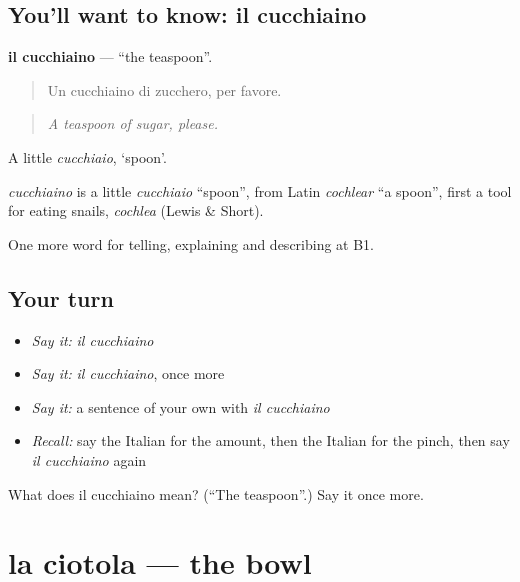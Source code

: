 \subsection*{You'll want to know: il cucchiaino}
\textbf{il cucchiaino} — \textquotedblleft{}the teaspoon\textquotedblright{}.

\begin{quote}
Un cucchiaino di zucchero, per favore.
\end{quote}

\begin{quote}
\emph{A teaspoon of sugar, please.}
\end{quote}

A little \emph{cucchiaio}, ‘spoon’.

\begin{cousinweb}
\emph{cucchiaino} is a little \emph{cucchiaio} \textquotedblleft{}spoon\textquotedblright{}, from Latin \emph{cochlear} \textquotedblleft{}a spoon\textquotedblright{}, first a tool for eating snails, \emph{cochlea} (Lewis \& Short).
\end{cousinweb}

\begin{grammarlens}[title={What you've built}]
One more word for telling, explaining and describing at B1.
\end{grammarlens}

\subsection*{Your turn}
\begin{itemize}
\raggedright
  \item \emph{Say it:} \emph{il cucchiaino}
  \item \emph{Say it:} \emph{il cucchiaino}, once more
  \item \emph{Say it:} a sentence of your own with \emph{il cucchiaino}
  \item \emph{Recall:} say the Italian for the amount, then the Italian for the pinch, then say \emph{il cucchiaino} again
\end{itemize}

\begin{tcolorbox}[breakable,colback=teal!4,colframe=teal!35!black,title={Before you move on}]
What does il cucchiaino mean? (\textquotedblleft{}The teaspoon\textquotedblright{}.) Say it once more.
\end{tcolorbox}
\section[la ciotola]{la ciotola — the bowl}

